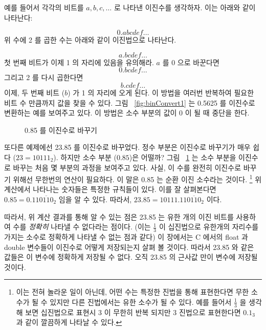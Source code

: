 예를 들어서 각각의 비트를 $a,b,c, \ldots$ 로 나타낸 이진수를 생각하자. 
이는 아래와 같이 나타난다:

\[ 0.abcdef\ldots \]
위 수에 2 를 곱한 수는 아래와 같이 이진법으로 나타난다. 

\[ a.bcdef\ldots \]
첫 번째 비트가 이제 1 의 자리에 있음을 유의해라. $a$ 를 $0$ 으로 바꾼다면
\[ 0.bcdef\ldots \]
그리고 2 를 다시 곱한다면 
\[ b.cdef\ldots \]
이제, 두 번째 비트 ($b$) 가 1 의 자리에 오게 된다. 이 방법을 여러번 반복하여
필요한 비트 수 만큼까지 값을 찾을 수 있다. 그림 ~\ref{fig:binConvert1} 는
0.5625 를 이진수로 변환하는 예를 보여주고 있다. 이 방법은 소수 부분의 값이
0 이 될 때 중단을 한다. 

\begin{figure}[t]
\centering
{}
\caption{0.85 를 이진수로 바꾸기\label{fig:binConvert2}}
\end{figure}

또다른 예제에선 23.85 를 이진수로 바꾸었다. 정수 부분은
이진수로 바꾸기가 매우 쉽다 ($23 = 10111_2$). 하지만 소수 부분 ($0.85$)은
어떨까? 그림 ~\ref{fig:binConvert2} 는 소수 부분을 이진수로 바꾸는
처음 몇 부분의 과정을 보여주고 있다. 사실, 이 수를 완전히 이진수로 바꾸기 위해선
무한번의 연산이 필요하다. 이 말은 0.85 는 순환 이진 소수라는 것이다.
\footnote{이는 전혀 놀라운 일이 아닌데, 어떤 수는 특정한 진법을 통해 
표현한다면 무한 소수가 될 수 있지만 다른 진법에서는 유한 소수가 될 수 있다.
예를 들어서 $\frac{1}{3}$ 을 생각해 보면 십진법으로 표현시 3 이 무한히 반복 되지만
3 진법으로 표현한다면 $0.1_3$ 과 같이 깔끔하게 나타날 수 있다.}
위 계산에서 나타나는 숫자들은 특정한 규칙들이 있다. 이를 잘 살펴본다면 
$0.85 = 0.11\overline{0110}_2$ 임을 알 수 있다. 따라서, $23.85 = 10111.11\overline{0110}_2$
이다. 

따라서, 위 계산 결과를 통해 알 수 있는 점은 23.85 는 유한 개의 이진 비트를 사용하여
수를 \emph{정확히} 나타낼 수 없다라는 점이다. (이는 $\frac{1}{3}$ 이 십진법으로
유한개의 자리수를 가지는 소수로 정확하게 나타낼 수 없는 점과 같다) 이 장에서는
C 에서의 {\code float} 과 {\code double} 변수들이 이진수로 어떻게 저장되는지 살펴 볼 것이다.
따라서 23.85 와 같은 값들은 이 변수에 정확하게 저장될 수 없다. 오직 23.85 의 근사값 만이
변수에 저장될 것이다. 

